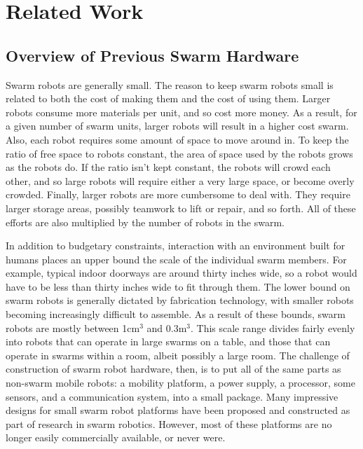 \chapter{Related Work}

\section{Overview of Previous Swarm Hardware} \label{section:Overview_of_Previous_Swarm_Hardware}

Swarm robots are generally small. 
The reason to keep swarm robots small is related to both the cost of making them and the cost of using them. 
Larger robots consume more materials per unit, and so cost more money.
As a result, for a given number of swarm units, larger robots will result in a higher cost swarm. 
Also, each robot requires some amount of space to move around in. 
To keep the ratio of free space to robots constant, the area of space used by the robots grows as the robots do. 
If the ratio isn't kept constant, the robots will crowd each other, and so large robots will require either a very large space, or become overly crowded.
Finally, larger robots are more cumbersome to deal with. 
They require larger storage areas, possibly teamwork to lift or repair, and so forth. 
All of these efforts are also multiplied by the number of robots in the swarm. 
 
In addition to budgetary constraints, interaction with an environment built for humans places an upper bound the scale of the individual swarm members. 
For example, typical indoor doorways are around thirty inches wide, so a robot would have to be less than thirty inches wide to fit through them. 
The lower bound on swarm robots is generally dictated by fabrication technology, with smaller robots becoming increasingly difficult to assemble. 
As a result of these bounds, swarm robots are mostly between 1cm$^3$ and 0.3m$^3$. 
This scale range divides fairly evenly into robots that can operate in large swarms on a table, and those that can operate in swarms within a room, albeit possibly a large room. 
The challenge of construction of swarm robot hardware, then, is to put all of the same parts as non-swarm mobile robots: a mobility platform, a power supply, a processor, some sensors, and a communication system, into a small package.
Many impressive designs for small swarm robot platforms have been proposed and constructed as part of research in swarm robotics. 
However, most of these platforms are no longer easily commercially available, or never were. 


